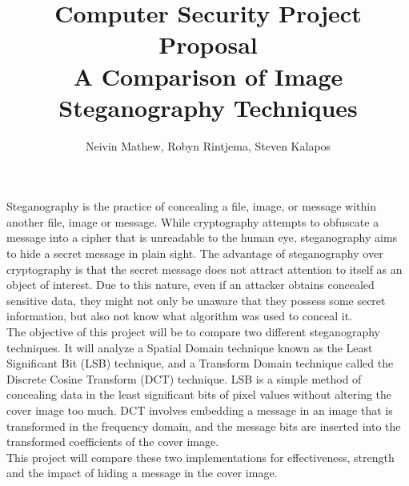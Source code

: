 \documentclass[letterpaper]{article}
\title{Computer Security Project Proposal \\
A Comparison of Image Steganography Techniques}
\author{
Neivin Mathew,
Robyn Rintjema,
Steven Kalapos
}
\begin{document}
\maketitle
\thispagestyle{empty}

Steganography is the practice of concealing a file, image, or message within another file, image or message. While cryptography attempts to obfuscate a message into a cipher that is unreadable to the human eye, steganography aims to hide a secret message in plain sight. The advantage of steganography over cryptography is that the secret message does not attract attention to itself as an object of interest. Due to this nature, even if an attacker obtains concealed sensitive data, they might not only be unaware that they possess some secret information, but also not know what algorithm was used to conceal it.\\

The objective of this project will be to compare two different steganography techniques. It will analyze a Spatial Domain technique known as the Least Significant Bit (LSB) technique, and a Transform Domain technique called the Discrete Cosine Transform (DCT) technique. LSB is a simple method of concealing data in the least significant bits of pixel values without altering the cover image too much. DCT involves embedding a message in an image that is transformed in the frequency domain, and the message bits are inserted into the transformed coefficients of the cover image.\\

This project will compare these two implementations for effectiveness, strength and the impact of hiding a message in the cover image.
\end{document}
